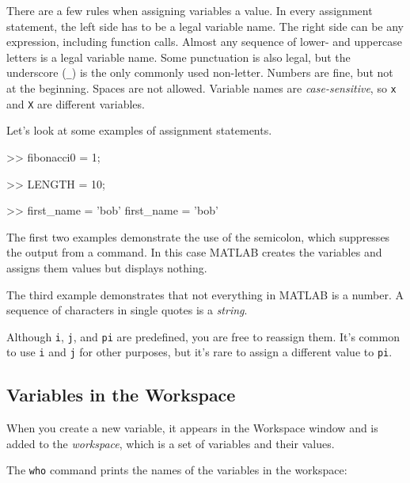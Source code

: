 \documentclass[../../book.tex]{subfiles}
\begin{document}

There are a few rules when assigning variables a value. In every assignment statement, the left side has to be a legal variable name.  The right side can be any expression, including function calls.
%
%
%
%
Almost any sequence of lower- and uppercase letters is a legal
variable name.
Some punctuation is also legal, but the underscore (\lstinline{_}) is the only commonly used non-letter.
Numbers are fine, but not at the beginning.
Spaces are not allowed.  Variable names are
\emph{case-sensitive}, so \lstinline{x} and \lstinline{X} are different variables.

Let's look at some examples of assignment statements.

\begin{code}
>> fibonacci0 = 1;

>> LENGTH = 10;

>> first_name = 'bob'
first_name = 'bob'
\end{code}

The first two examples demonstrate the use of the semicolon, which
suppresses the output from a command.  In this case MATLAB creates the
variables and assigns them values but displays nothing.
%
%
%
%

The third example demonstrates that not everything
in MATLAB is a number.
A sequence of characters in single quotes is
a \emph{string}.


Although \lstinline{i}, \lstinline{j}, and \lstinline{pi} are predefined, you are free
to reassign them.  It's common to use \lstinline{i} and \lstinline{j} for other
purposes, but it's rare to assign a different value to
\lstinline{pi}.



\subsection{Variables in the Workspace}

When you create a new variable, it appears in the Workspace window and is added to the \emph{workspace}, which is a
set of variables and their values.


The \lstinline{who} command prints the
names of the variables in the workspace:
\end{document}
